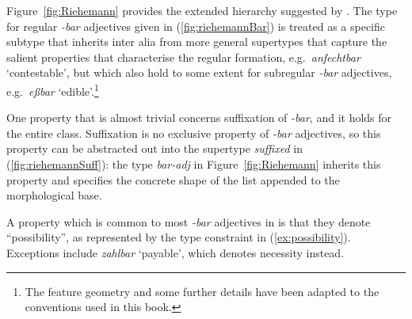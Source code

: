 \documentclass[output=paper
 	        ,biblatex
                ,babelshorthands
                ,newtxmath
                ,draftmode
                ,colorlinks, citecolor=brown
]{langscibook}
\begin{document}
Figure~\ref{fig:Riehemann} provides the extended hierarchy suggested
by \citet{Riehemann98}. The type for regular \textit{-bar} adjectives
given in (\ref{fig:riehemannBar}) is treated as a specific subtype
that inherits inter alia from more general supertypes that capture the
salient properties that characterise the regular formation,
e.g.\ \textit{anfechtbar} `contestable', but which also hold to some
extent for subregular \textit{-bar} adjectives, e.g.\ \textit{eßbar}
`edible'.\footnote{%
  The feature geometry and some further details have been adapted to
  the conventions used in this
  book. %
}

  
One property that is almost trivial concerns suffixation of
\textit{-bar}, and it holds for the entire class. Suffixation is no
exclusive property of \textit{-bar} adjectives, so this property can
be abstracted out into the supertype \textit{suffixed} in
(\ref{fig:riehemannSuff}): the type \textit{bar-adj} in
Figure~\ref{fig:Riehemann} inherits this property and specifies the
concrete shape of the list appended to the morphological base.

\ea
	\label{fig:riehemannSuff}
\z


\begin{sloppypar}
  A property which is common to most \textit{-bar} adjectives in
   is that they denote ``possibility'', as represented by the
  type constraint in (\ref{ex:possibility}). Exceptions include
  \textit{zahlbar} `payable', which denotes necessity instead. 
\end{sloppypar}

\begin{exe}

  \ex \label{ex:possibility}
\end{exe}
\end{document}
